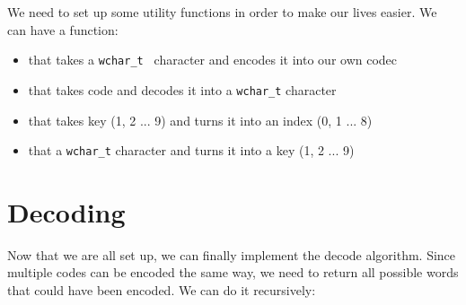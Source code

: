\documentclass[a4paper,11pt]{article}
\begin{document}
    We need to set up some utility functions in order to make our lives easier.
    We can have a function:
    \begin{itemize}
        \item that takes a {\tt wchar\_t } character and encodes it into our own codec
        \item that takes code and decodes it into a {\tt wchar\_t} character
        \item that takes key (1, 2 ... 9) and turns it into an index (0, 1 ... 8)
        \item that a {\tt wchar\_t} character and turns it into a key (1, 2 ... 9)
     \end{itemize}

     \section*{Decoding}

     Now that we are all set up, we can finally implement the decode algorithm.
     Since multiple codes can be encoded the same way, we need to return all possible words that could have been encoded.
     We can do it recursively:
\end{document}
